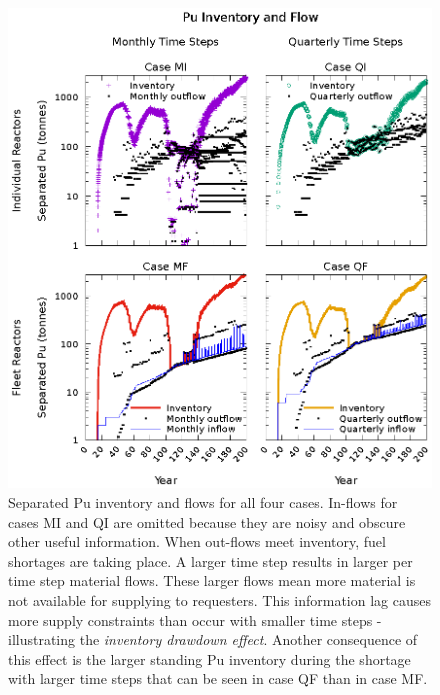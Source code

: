 \documentclass{style}
\begin{document}
\begin{figure}[!h]
    \centering
    \includegraphics[width=1.0\textwidth]{exp2/puinv.eps}
    \caption[Separated Pu inventory and flow]{
        Separated Pu inventory and flows for all four cases.  In-flows for
        cases MI and QI are omitted because they are noisy and obscure other
        useful information.  When out-flows meet inventory, fuel shortages are taking place. A larger time step results in larger per time
        step material flows. These larger flows mean more material is not
        available for supplying to requesters.  This information lag causes
        more supply constraints than occur with smaller time steps -
        illustrating the \emph{inventory drawdown effect}. Another consequence of
        this effect is the larger standing Pu inventory during the shortage
        with larger time steps that can be seen in case QF than in case MF.
    }
    \label{fig:puinv}
\end{figure}
\end{document}
